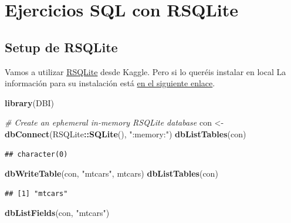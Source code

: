 \documentclass[]{book}
\newenvironment{Shaded}{\begin{snugshade}}{\end{snugshade}}
\newcommand{\CommentTok}[1]{\textcolor[rgb]{0.56,0.35,0.01}{\textit{#1}}}
\newcommand{\KeywordTok}[1]{\textcolor[rgb]{0.13,0.29,0.53}{\textbf{#1}}}
\newcommand{\NormalTok}[1]{#1}
\newcommand{\OperatorTok}[1]{\textcolor[rgb]{0.81,0.36,0.00}{\textbf{#1}}}
\newcommand{\StringTok}[1]{\textcolor[rgb]{0.31,0.60,0.02}{#1}}
\begin{document}
\hypertarget{ejercicios-sql-con-rsqlite}{%
\section{Ejercicios SQL con RSQLite}\label{ejercicios-sql-con-rsqlite}}

\hypertarget{setup-de-rsqlite}{%
\subsection{Setup de RSQLite}\label{setup-de-rsqlite}}

Vamos a utilizar \href{https://cran.r-project.org/web/packages/RSQLite/index.html}{RSQLite} desde Kaggle. Pero si lo queréis instalar en local La información para su instalación está \href{https://db.rstudio.com/databases/sqlite/}{en el siguiente enlace}.

\begin{Shaded}
\begin{Highlighting}[]
\KeywordTok{library}\NormalTok{(DBI)}

\CommentTok{# Create an ephemeral in-memory RSQLite database}
\NormalTok{con <-}\StringTok{ }\KeywordTok{dbConnect}\NormalTok{(RSQLite}\OperatorTok{::}\KeywordTok{SQLite}\NormalTok{(), }\StringTok{":memory:"}\NormalTok{)}
\KeywordTok{dbListTables}\NormalTok{(con)}
\end{Highlighting}
\end{Shaded}

\begin{verbatim}
## character(0)
\end{verbatim}

\begin{Shaded}
\begin{Highlighting}[]
\KeywordTok{dbWriteTable}\NormalTok{(con, }\StringTok{"mtcars"}\NormalTok{, mtcars)}
\KeywordTok{dbListTables}\NormalTok{(con)}
\end{Highlighting}
\end{Shaded}

\begin{verbatim}
## [1] "mtcars"
\end{verbatim}

\begin{Shaded}
\begin{Highlighting}[]
\KeywordTok{dbListFields}\NormalTok{(con, }\StringTok{"mtcars"}\NormalTok{)}
\end{Highlighting}
\end{Shaded}
\end{document}
